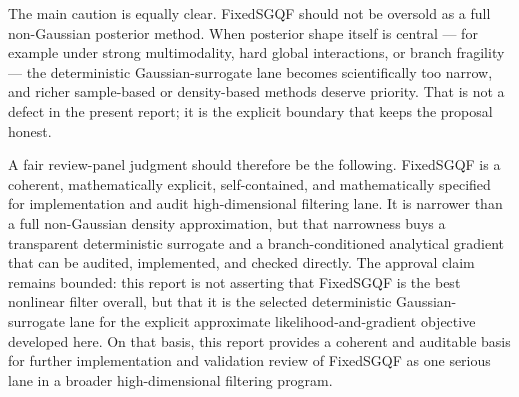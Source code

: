 \documentclass[11pt]{article}
\numberwithin{equation}{section}
\begin{document}
The main caution is equally clear.  FixedSGQF should not be oversold as a full
non-Gaussian posterior method.  When posterior shape itself is central --- for
example under strong multimodality, hard global interactions, or branch
fragility --- the deterministic Gaussian-surrogate lane becomes scientifically
too narrow, and richer sample-based or density-based methods deserve priority.
That is not a defect in the present report; it is the explicit boundary that
keeps the proposal honest.

A fair review-panel judgment should therefore be the following.  FixedSGQF is a
coherent, mathematically explicit, self-contained, and mathematically specified
for implementation and audit high-dimensional filtering lane.  It is narrower
than a full non-Gaussian density approximation, but that narrowness buys a
transparent deterministic surrogate and a branch-conditioned analytical gradient
that can be audited, implemented, and checked directly.  The approval claim
remains bounded: this report is not asserting that FixedSGQF is the best
nonlinear filter overall, but that it is the selected deterministic
Gaussian-surrogate lane for the explicit approximate likelihood-and-gradient
objective developed here.  On that basis, this report provides a coherent and
auditable basis for further implementation and validation review of FixedSGQF
as one serious lane in a broader high-dimensional filtering program.



\end{document}
